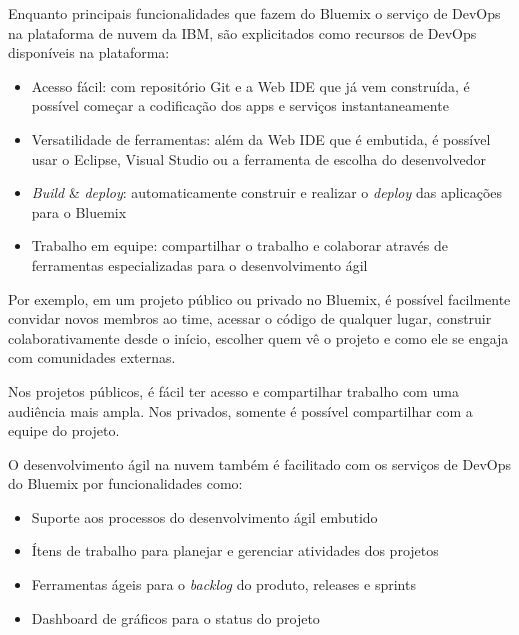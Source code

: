 Enquanto principais funcionalidades que fazem do Bluemix o serviço de DevOps na plataforma de nuvem da IBM, são explicitados como recursos de DevOps disponíveis na plataforma:
\begin{itemize}
    \item Acesso fácil: com repositório Git e a Web IDE que já vem construída, é possível começar a codificação dos apps e serviços instantaneamente
    \item Versatilidade de ferramentas: além da Web IDE que é embutida, é possível usar o Eclipse, Visual Studio ou a ferramenta de escolha do desenvolvedor
    \item \textit{Build} \& \textit{deploy}: automaticamente construir e realizar o \textit{deploy} das aplicações para o Bluemix
    \item Trabalho em equipe: compartilhar o trabalho e colaborar através de ferramentas especializadas para o desenvolvimento ágil
\end{itemize}

Por exemplo, em um projeto público ou privado no Bluemix, é possível facilmente convidar novos membros ao time, acessar o código de qualquer lugar, construir colaborativamente desde o início, escolher quem vê o projeto e como ele se engaja com comunidades externas.

Nos projetos públicos, é fácil ter acesso e compartilhar trabalho com uma audiência mais ampla. Nos privados, somente é possível compartilhar com a equipe do projeto.

O desenvolvimento ágil na nuvem também é facilitado com os serviços de DevOps do Bluemix por funcionalidades como:
\begin{itemize}
    \item Suporte aos processos do desenvolvimento ágil embutido
    \item Ítens de trabalho para planejar e gerenciar atividades dos projetos
    \item Ferramentas ágeis para o \textit{backlog} do produto, releases e sprints
    \item Dashboard de gráficos para o status do projeto
\end{itemize}

